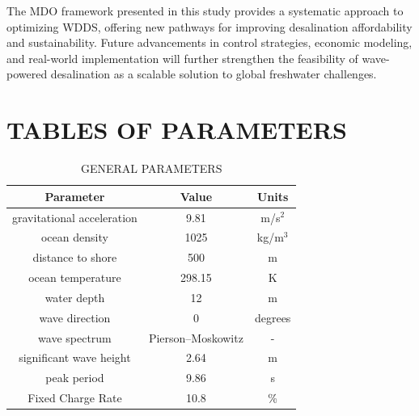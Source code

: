 \documentclass[twocolumn,10pt]{asme2e}
\begin{document}
The MDO framework presented in this study provides a systematic approach to optimizing WDDS, offering new pathways for improving desalination affordability and sustainability. Future advancements in control strategies, economic modeling, and real-world implementation will further strengthen the feasibility of wave-powered desalination as a scalable solution to global freshwater challenges.




\appendix
\newpage
\section{TABLES OF PARAMETERS} \label{app:params}
\begin{table}[h]
    \centering
    \caption{GENERAL PARAMETERS}
    \begin{tabular}{ccc}
        \hline
        \textbf{Parameter} & \textbf{Value} & \textbf{Units} \\
        \hline
        gravitational acceleration & 9.81 & m/s$^2$ \\
        ocean density & 1025 & kg/m$^3$ \\
        distance to shore & 500 & m \\
        ocean temperature & 298.15 & K \\
        water depth & 12 & m \\
        wave direction & 0 \cite{Yu2018} & degrees \\
        
        wave spectrum & Pierson–Moskowitz \cite{Yu2018} & -  \\
        significant wave height & 2.64 \cite{Yu2018} & m \\
        peak period & 9.86 \cite{Yu2018} & s \\

        Fixed Charge Rate & 10.8 \cite{LCOE_DOE} & \% \\
        \hline
    \end{tabular}
    \label{tab:paramsgeneral}
\end{table}
\end{document}

